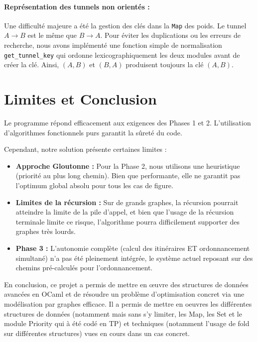 \documentclass[a4paper,11pt]{article}
\begin{document}
\paragraph{Représentation des tunnels non orientés :}
Une difficulté majeure a été la gestion des clés dans la \texttt{Map} des poids. Le tunnel $A \to B$ est le même que $B \to A$. Pour éviter les duplications ou les erreurs de recherche, nous avons implémenté une fonction simple de normalisation \texttt{get\_tunnel\_key} qui ordonne lexicographiquement les deux modules avant de créer la clé. Ainsi, $(A, B)$ et $(B, A)$ produisent toujours la clé $(A, B)$.

\section{Limites et Conclusion}

Le programme répond efficacement aux exigences des Phases 1 et 2. L'utilisation d'algorithmes fonctionnels purs garantit la sûreté du code.

Cependant, notre solution présente certaines limites :
\begin{itemize}
    \item \textbf{Approche Gloutonne :} Pour la Phase 2, nous utilisons une heuristique (priorité au plus long chemin). Bien que performante, elle ne garantit pas l'optimum global absolu pour tous les cas de figure.
    \item \textbf{Limites de la récursion :} Sur de grands graphes, la récursion pourrait atteindre la limite de la pile d'appel, et bien que l'usage de la récursion terminale limite ce risque, l'algorithme pourra difficilement supporter des graphes très lourds.
    \item \textbf{Phase 3 :} L'autonomie complète (calcul des itinéraires ET ordonnancement simultané) n'a pas été pleinement intégrée, le système actuel reposant sur des chemins pré-calculés pour l'ordonnancement.
\end{itemize}

En conclusion, ce projet a permis de mettre en œuvre des structures de données avancées en OCaml et de résoudre un problème d'optimisation concret via une modélisation par graphes efficace.
Il a permis de mettre en oeuvres les différentes structures de données (notamment mais sans s'y limiter, les Map, les Set et le module Priority qui à été codé en TP) et techniques (notamment l'usage de fold sur différentes structures) vues en cours dans un cas concret.
\end{document}
